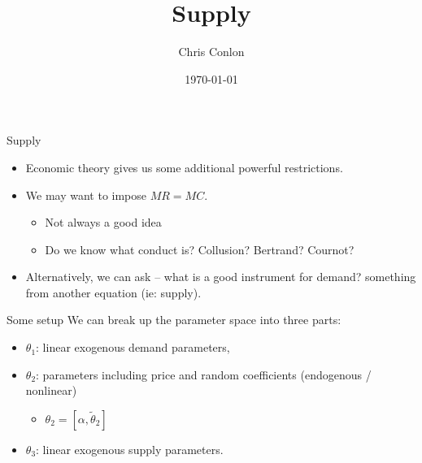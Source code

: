 \documentclass[xcolor=pdftex,dvipsnames,table,mathserif,aspectratio=169]{beamer}
\begin{document}
\title{Supply }
\author{Chris Conlon}
\date{\today}

\frame{\titlepage}

\begin{frame}{Supply}
\begin{itemize}
\item Economic theory gives us some additional powerful restrictions.
\item We may want to impose $MR = MC$.
\begin{itemize}
\item Not always a good idea
\item Do we know what conduct is? Collusion? Bertrand? Cournot?
\end{itemize}

\item Alternatively, we can ask -- what is a good instrument for demand? \alert{something from another equation} (ie: supply).
\end{itemize}
\end{frame}

\begin{frame}{Some setup}
We can break up the parameter space into three parts:
\begin{itemize}
\item $\theta_1$: linear exogenous demand parameters, 
 \item $\theta_2$: parameters including price and random coefficients (endogenous / nonlinear)
 \begin{itemize}
 \item $\theta_2 = [\alpha, \widetilde{\theta}_2]$
\end{itemize}
 \item $\theta_3$: linear exogenous supply parameters.
\end{itemize}
\end{frame}
\end{document}
